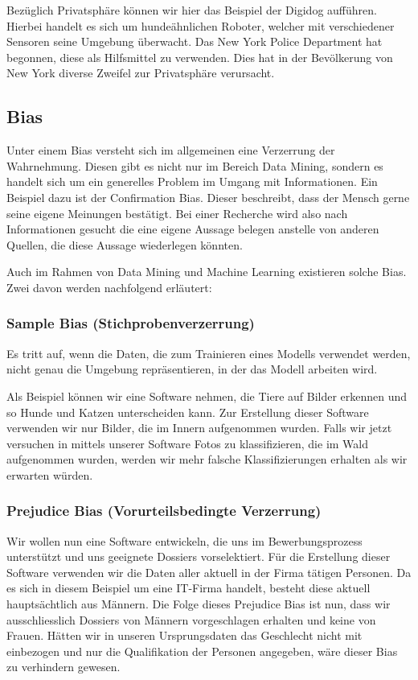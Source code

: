 Bezüglich Privatsphäre können wir hier das Beispiel der Digidog aufführen. Hierbei handelt es sich um hundeähnlichen Roboter, welcher mit verschiedener Sensoren seine Umgebung überwacht. Das New York Police Department hat begonnen, diese als Hilfsmittel zu verwenden. Dies hat in der Bevölkerung von New York diverse Zweifel zur Privatsphäre verursacht.\cite{nypd}

\subsection{Bias}
Unter einem Bias versteht sich im allgemeinen eine Verzerrung der Wahrnehmung. Diesen gibt es nicht nur im Bereich Data Mining, sondern es handelt sich um ein generelles Problem im Umgang mit Informationen.
Ein Beispiel dazu ist der Confirmation Bias. Dieser beschreibt, dass der Mensch gerne seine eigene Meinungen bestätigt. Bei einer Recherche wird also nach Informationen gesucht die eine eigene Aussage belegen anstelle von anderen Quellen, die diese Aussage wiederlegen könnten.\cite{bias}

Auch im Rahmen von Data Mining und Machine Learning existieren solche Bias. Zwei davon werden nachfolgend erläutert: \cite{bias2}

\subsubsection{Sample Bias (Stichprobenverzerrung)}
Es tritt auf, wenn die Daten, die zum Trainieren eines Modells verwendet werden, nicht genau die Umgebung repräsentieren, in der das Modell arbeiten wird. 

Als Beispiel können wir eine Software nehmen, die Tiere auf Bilder erkennen und so Hunde und Katzen unterscheiden kann. Zur Erstellung dieser Software verwenden wir nur Bilder, die im Innern aufgenommen wurden. Falls wir jetzt versuchen in mittels unserer Software Fotos zu klassifizieren, die im Wald aufgenommen wurden, werden wir mehr falsche Klassifizierungen erhalten als wir erwarten würden.

\subsubsection{Prejudice Bias (Vorurteilsbedingte Verzerrung)}
Wir wollen nun eine Software entwickeln, die uns im Bewerbungsprozess unterstützt und uns geeignete Dossiers vorselektiert.
Für die Erstellung dieser Software verwenden wir die Daten aller aktuell in der Firma tätigen Personen. Da es sich in diesem Beispiel um eine IT-Firma handelt, besteht diese aktuell hauptsächtlich aus Männern.
Die Folge dieses Prejudice Bias ist nun, dass wir ausschliesslich Dossiers von Männern vorgeschlagen erhalten und keine von Frauen.
Hätten wir in unseren Ursprungsdaten das Geschlecht nicht mit einbezogen und nur die Qualifikation der Personen angegeben, wäre dieser Bias zu verhindern gewesen.